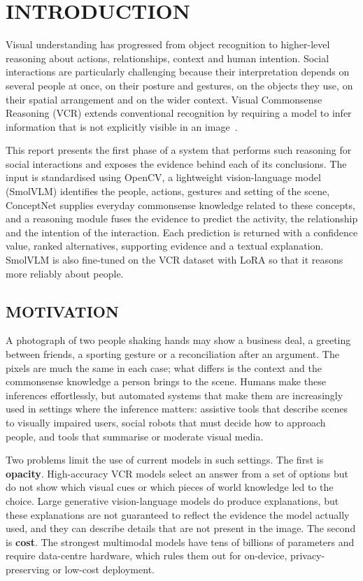 
\chapter{INTRODUCTION} %
\label{ch:intro}

Visual understanding has progressed from object recognition to higher-level reasoning about actions, relationships, context and human intention. Social interactions are particularly challenging because their interpretation depends on several people at once, on their posture and gestures, on the objects they use, on their spatial arrangement and on the wider context. Visual Commonsense Reasoning (VCR) extends conventional recognition by requiring a model to infer information that is not explicitly visible in an image~\cite{zellers2019vcr}.

This report presents the first phase of a system that performs such reasoning for social interactions and exposes the evidence behind each of its conclusions. The input is standardised using OpenCV, a lightweight vision-language model (SmolVLM) identifies the people, actions, gestures and setting of the scene, ConceptNet supplies everyday commonsense knowledge related to these concepts, and a reasoning module fuses the evidence to predict the activity, the relationship and the intention of the interaction. Each prediction is returned with a confidence value, ranked alternatives, supporting evidence and a textual explanation. SmolVLM is also fine-tuned on the VCR dataset with LoRA so that it reasons more reliably about people.

\section{MOTIVATION}

A photograph of two people shaking hands may show a business deal, a greeting between friends, a sporting gesture or a reconciliation after an argument. The pixels are much the same in each case; what differs is the context and the commonsense knowledge a person brings to the scene. Humans make these inferences effortlessly, but automated systems that make them are increasingly used in settings where the inference matters: assistive tools that describe scenes to visually impaired users, social robots that must decide how to approach people, and tools that summarise or moderate visual media.

Two problems limit the use of current models in such settings. The first is \textbf{opacity}. High-accuracy VCR models select an answer from a set of options but do not show which visual cues or which pieces of world knowledge led to the choice. Large generative vision-language models do produce explanations, but these explanations are not guaranteed to reflect the evidence the model actually used, and they can describe details that are not present in the image. The second is \textbf{cost}. The strongest multimodal models have tens of billions of parameters and require data-centre hardware, which rules them out for on-device, privacy-preserving or low-cost deployment.

